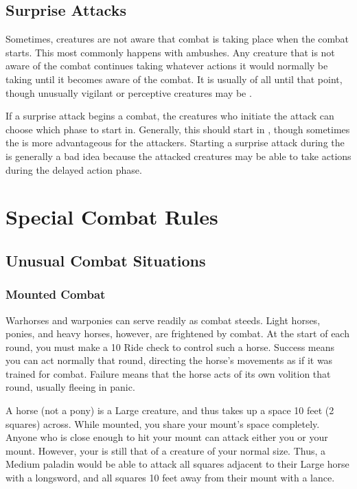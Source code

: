     \subsection{Surprise Attacks}\label{Surprise Attacks}
        Sometimes, creatures are not aware that combat is taking place when the combat starts.
        This most commonly happens with ambushes.
        Any creature that is not aware of the combat continues taking whatever actions it would normally be taking until it becomes aware of the combat.
        It is usually \unaware of all until that point, though unusually vigilant or perceptive creatures may be \partiallyunaware.

        If a surprise attack begins a combat, the creatures who initiate the attack can choose which phase to start in.
        Generally, this should start in , though sometimes the  is more advantageous for the attackers.
        Starting a surprise attack during the  is generally a bad idea because the attacked creatures may be able to take actions during the delayed action phase.

\section{Special Combat Rules}

    \subsection{Unusual Combat Situations}

        \subsubsection{Mounted Combat}\label{Mounted Combat}
             Warhorses and warponies can serve readily as combat steeds. Light horses, ponies, and heavy horses, however, are frightened by combat.
            At the start of each round, you must make a  10 Ride check to control such a horse.
            Success means you can act normally that round, directing the horse's movements as if it was trained for combat.
            Failure means that the horse acts of its own volition that round, usually fleeing in panic.

             A horse (not a pony) is a Large creature, and thus takes up a space 10 feet (2 squares) across. While mounted, you share your mount's space completely. Anyone who is close enough to hit your mount can attack either you or your mount. However, your  is still that of a creature of your normal size. Thus, a Medium paladin would be able to attack all squares adjacent to their Large horse with a longsword, and all squares 10 feet away from their mount with a lance.

